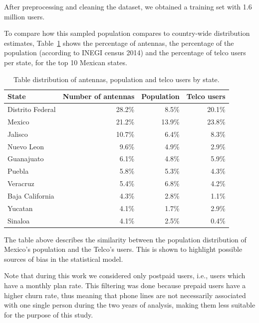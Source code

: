 After preprocessing and cleaning the dataset, we obtained
a training set with 1.6 million users.

To compare how this sampled population compares to country-wide distribution estimates,
Table~\cref{tab:distribution_by_state} shows the percentage of antennas, the percentage of the population (according to INEGI census 2014) and
the percentage of telco users per state, for the top 10 Mexican states.


\begin{table}[ht]
	\caption{Table distribution of antennas, population and telco users by state.}
	\label{tab:distribution_by_state}
	\centering
	\begin{tabular}{l r r r}
		\toprule
		State				& Number of antennas & Population 	& Telco users \\
		\midrule
		Distrito Federal      & 28.2\% 	& 8.5\%		& 20.1\%   \\
		Mexico                     & 21.2\%		&   13.9\% 	& 23.8\%   \\
		Jalisco                   & 10.7\% 	& 6.4\%		& 8.3\%    \\
		Nuevo Leon               & 9.6\%	& 4.9\%		& 2.9\% \\
		Guanajuato               & 6.1\%	& 4.8\%		& 5.9\% \\
		Puebla                     & 5.8\%	& 5.3\%		& 4.3\% \\
		Veracruz                  & 5.4\% 	& 6.8\%		& 4.2\% \\
		Baja California       & 4.3\%	& 2.8\%		& 1.1\% \\
		Yucatan                   & 4.1\%	& 1.7\%		& 2.9\% \\
		Sinaloa                   & 4.1\%	& 2.5\%		& 0.4\% \\
		\bottomrule
	\end{tabular}
\end{table}

The table above describes the similarity between the population distribution of Mexico's population and the Telco's users. This is shown to highlight possible sources of bias in the statistical model.

Note that during this work we considered only postpaid users, i.e., users which have a monthly plan rate. This filtering was done because prepaid users have a higher churn rate, thus meaning that phone lines are not necessarily associated with one single person during the two years of analysis, making them less suitable for the purpose of this study.


